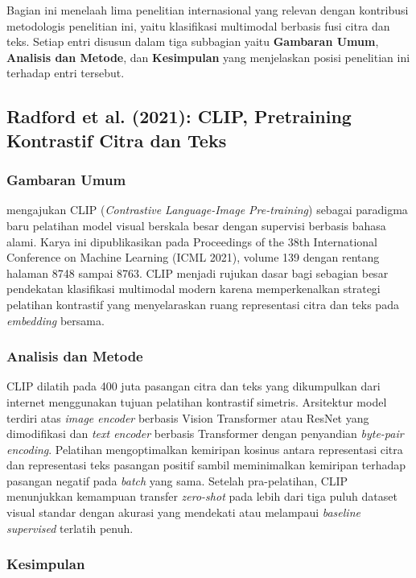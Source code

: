Bagian ini menelaah lima penelitian internasional yang relevan dengan kontribusi metodologis penelitian ini, yaitu klasifikasi multimodal berbasis fusi citra dan teks. Setiap entri disusun dalam tiga subbagian yaitu \textbf{Gambaran Umum}, \textbf{Analisis dan Metode}, dan \textbf{Kesimpulan} yang menjelaskan posisi penelitian ini terhadap entri tersebut.

\subsection{Radford et al. (2021): CLIP, Pretraining Kontrastif Citra dan Teks}

\subsubsection{Gambaran Umum}

\citet{radfordCLIP2021} mengajukan CLIP (\textit{Contrastive Language-Image Pre-training}) sebagai paradigma baru pelatihan model visual berskala besar dengan supervisi berbasis bahasa alami. Karya ini dipublikasikan pada Proceedings of the 38th International Conference on Machine Learning (ICML 2021), volume 139 dengan rentang halaman 8748 sampai 8763. CLIP menjadi rujukan dasar bagi sebagian besar pendekatan klasifikasi multimodal modern karena memperkenalkan strategi pelatihan kontrastif yang menyelaraskan ruang representasi citra dan teks pada \textit{embedding} bersama.

\subsubsection{Analisis dan Metode}

CLIP dilatih pada 400 juta pasangan citra dan teks yang dikumpulkan dari internet menggunakan tujuan pelatihan kontrastif simetris. Arsitektur model terdiri atas \textit{image encoder} berbasis Vision Transformer atau ResNet yang dimodifikasi dan \textit{text encoder} berbasis Transformer dengan penyandian \textit{byte-pair encoding}. Pelatihan mengoptimalkan kemiripan kosinus antara representasi citra dan representasi teks pasangan positif sambil meminimalkan kemiripan terhadap pasangan negatif pada \textit{batch} yang sama. Setelah pra-pelatihan, CLIP menunjukkan kemampuan transfer \textit{zero-shot} pada lebih dari tiga puluh dataset visual standar dengan akurasi yang mendekati atau melampaui \textit{baseline supervised} terlatih penuh.

\subsubsection{Kesimpulan}

